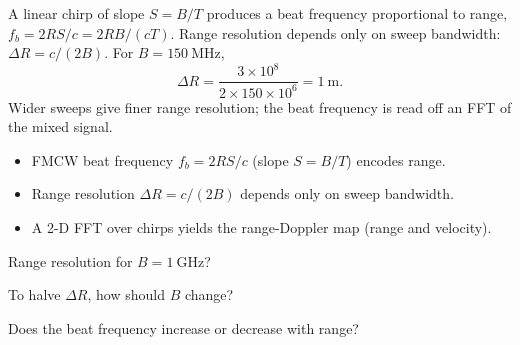 \begin{workedexample}
A linear chirp of slope $S = B/T$ produces a beat frequency proportional to
range, $f_b = 2RS/c = 2RB/(cT)$. Range resolution depends only on sweep bandwidth:
$\Delta R = c/(2B)$. For $B = 150\ \text{MHz}$,
\[ \Delta R = \frac{3\times10^8}{2\times150\times10^6} = 1\ \text{m}. \]
Wider sweeps give finer range resolution; the beat frequency is read off an FFT of
the mixed signal.
\end{workedexample}

\begin{keytakeaways}
\begin{itemize}[leftmargin=1.4em,itemsep=2pt]
\item FMCW beat frequency $f_b = 2RS/c$ (slope $S = B/T$) encodes range.
\item Range resolution $\Delta R = c/(2B)$ depends only on sweep bandwidth.
\item A 2-D FFT over chirps yields the range-Doppler map (range and velocity).
\end{itemize}
\end{keytakeaways}

\begin{exercises}
\item Range resolution for $B = 1\ \text{GHz}$?
\item To halve $\Delta R$, how should $B$ change?
\item Does the beat frequency increase or decrease with range?
\end{exercises}

